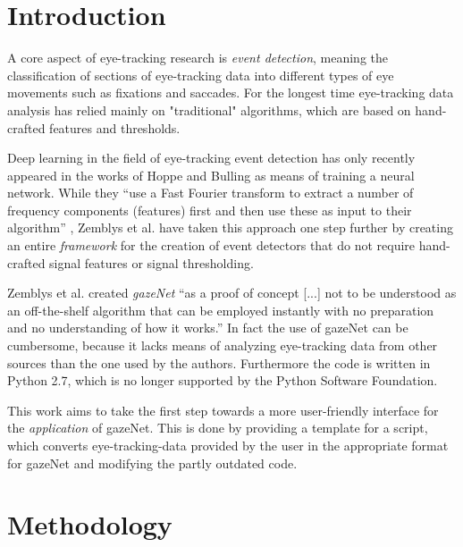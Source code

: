 \documentclass[conference]{IEEEtran}
\begin{document}
\section{Introduction}
A core aspect of eye-tracking research is \emph{event detection}, meaning the classification of sections of eye-tracking data into different types of eye movements such as fixations and saccades. For the longest time eye-tracking data analysis has relied mainly on "traditional" algorithms, which are based on hand-crafted features and thresholds. \cite{zemblys2018gazeNet} 

Deep learning in the field of eye-tracking event detection has only recently appeared in the works of Hoppe and Bulling \cite{Hoppe2016EndtoEndEM} as means of training a neural network. While they ``use a Fast Fourier transform to extract a number of frequency components (features) first and then use these as input to their algorithm'' \cite{Hoppe2016EndtoEndEM}, Zemblys et al. \cite{zemblys2018gazeNet} have taken this approach one step further by creating an entire \emph{framework} for the creation of event detectors that do not require hand-crafted signal features or signal thresholding.

Zemblys et al. \cite{zemblys2018gazeNet} created \emph{gazeNet} ``as a proof of concept [...] not to be understood as an off-the-shelf algorithm that can be employed instantly with no preparation and no understanding of how it works.'' \cite*{zemblys2018gazeNet} In fact the use of gazeNet can be cumbersome, because it lacks means of analyzing eye-tracking data from other sources than the one used by the authors. Furthermore the code is written in Python 2.7, which is no longer supported by the Python Software Foundation.

This work aims to take the first step towards a more user-friendly interface for the \emph{application} of gazeNet. This is done by providing a template for a script, which converts eye-tracking-data provided by the user in the appropriate format for gazeNet and modifying the partly outdated code.


\section{Methodology}
\end{document}
